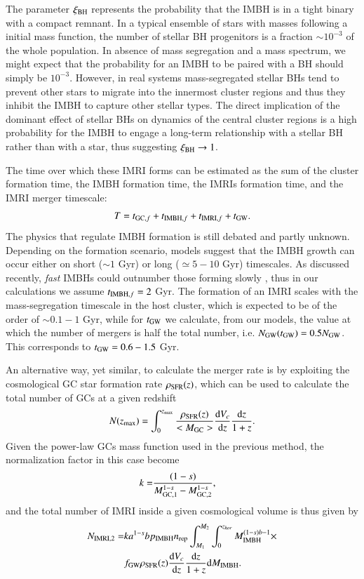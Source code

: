 \documentclass[article]{aa}
\newcommand{\derd}{{\rm d}}
\newcommand{\gw}{{\rm GW}}
\newcommand{\gc}{{\rm GC}}
\newcommand{\ibh}{{\rm IMBH}}
\newcommand{\imri}{{\rm IMRI}}
\newcommand{\bh}{{\rm BH}}
\begin{document}
The parameter $\xi_\bh$ represents the probability that the IMBH is in a tight binary with a compact remnant. In a typical ensemble of stars with masses following a \cite{kroupa01} initial mass function, the number of stellar BH progenitors is a fraction $\sim 10^{-3}$ of the whole population. In absence of mass segregation and a mass spectrum, we might expect that the probability for an IMBH to be paired with a BH should simply be $10^{-3}$. However, in real systems mass-segregated stellar BHs tend to prevent other stars to migrate into the innermost cluster regions and thus they inhibit the IMBH to capture other stellar types. The direct implication of the dominant effect of stellar BHs on dynamics of the central cluster regions is a high probability for the IMBH to engage a long-term relationship with a stellar BH rather than with a star, thus suggesting $\xi_\bh \rightarrow 1$.


The time over which these IMRI forms can be estimated as the sum of the cluster formation time, the IMBH formation time, the IMRIs formation time, and the IMRI merger timescale:
\begin{equation}
T = t_{\gc ,f} + t_{\ibh ,f} + t_{\imri, f} + t_{\rm GW}. 
\end{equation}
The physics that regulate IMBH formation is still debated and partly unknown. Depending on the formation scenario, models suggest that the IMBH growth can occur either on short ($\sim 1$ Gyr) or long ($\simeq 5-10$ Gyr) timescales. As discussed recently, {\it fast} IMBHs could outnumber those forming slowly \citep{giersz15,AAG19}, thus in our calculations we assume $t_{\ibh ,f} = 2$ Gyr. 
The formation of an IMRI scales with the mass-segregation timescale in the host cluster, which is expected to be of the order of $\sim 0.1-1$ Gyr, while for $t_\gw$ we calculate, from our models, the value at which the number of mergers is half the total number, i.e. $N_\gw(t_\gw) = 0.5 N_\gw$. This corresponds to $t_\gw = 0.6-1.5$ Gyr. 

An alternative way, yet similar, to calculate the merger rate is by exploiting the cosmological GC star formation rate $\rho_{\rm SFR}(z)$, which can be used to calculate the total number of GCs at a given redshift
\begin{equation}
N(z_{\rm max}) =  \int_0^{z_{\rm max}} \frac{\rho_{\rm SFR}(z)}{<M_\gc>}\frac{\derd V_c}{\derd z}\frac{\derd z}{1+z}.
\end{equation} 
Given the power-law GCs mass function used in the previous method, the normalization factor in this case become
\begin{align}
k  =&\frac{(1-s)}{M_{\gc, 1}^{1-s} - M_{\gc ,2}^{1-s}},
\end{align}
and the total number of IMRI inside a given cosmological volume is thus given by
\begin{align}
N_{\imri, 2} = & k a^{1-s} b p_\ibh n_{\rm rep} \int_{M_{1}}^{M_{2}} \int_0^{z_{hor}} M_\ibh^{(1-s)b-1} \times \nonumber \\
& f_{\gw}  \rho_{\rm SFR}(z)\frac{\derd V_c}{\derd z} \frac{\derd z}{1+z} \derd M_\ibh.
\label{eq:nimri2}
\end{align}
\end{document}

